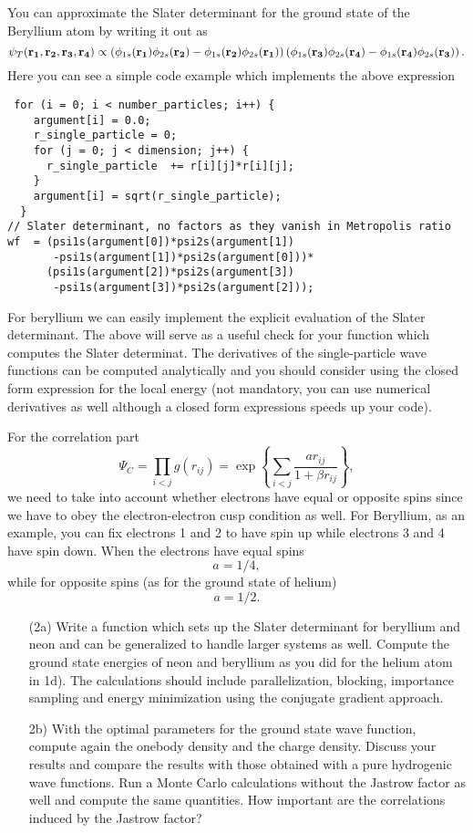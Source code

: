 \documentclass[10pt]{article}
\begin{document}
You can approximate the Slater determinant for the ground state of the Beryllium atom
by writing it out as
\begin{equation}
   \psi_{T}({\bf r_1},{\bf r_2}, {\bf r_3}, {\bf r_4}) \propto 
\left(\phi_{1s}({\bf r_1})\phi_{2s}({\bf r_2})-\phi_{1s}({\bf r_2})\phi_{2s}({\bf r_1})\right)
\left(\phi_{1s}({\bf r_3})\phi_{2s}({\bf r_4})-\phi_{1s}({\bf r_4})\phi_{2s}({\bf r_3})\right).
\end{equation}
Here you can see a simple code example which implements the above expression
\begin{lstlisting}
 for (i = 0; i < number_particles; i++) {
    argument[i] = 0.0;
    r_single_particle = 0;
    for (j = 0; j < dimension; j++) {
      r_single_particle  += r[i][j]*r[i][j];
    }
    argument[i] = sqrt(r_single_particle);
  }
// Slater determinant, no factors as they vanish in Metropolis ratio
wf  = (psi1s(argument[0])*psi2s(argument[1])
       -psi1s(argument[1])*psi2s(argument[0]))*
      (psi1s(argument[2])*psi2s(argument[3])
       -psi1s(argument[3])*psi2s(argument[2]));
\end{lstlisting}
For beryllium we can easily implement the explicit evaluation of the Slater determinant.  The above will serve as a useful check
for your function which computes the Slater determinat. 
The derivatives of the single-particle wave functions can be computed analytically and you should consider
using the closed form expression for the local energy (not mandatory, you can use numerical derivatives as well although a closed form expressions speeds up your code).

For the correlation part 
\[
\Psi_C=\prod_{i< j}g(r_{ij})= \exp{\left\{\sum_{i<j}\frac{ar_{ij}}{1+\beta r_{ij}}\right\}},
\]
we need to take into account whether electrons have equal or opposite spins since we have to obey the
electron-electron cusp condition as well.  For Beryllium, as an example,  you can fix electrons 1 and 2 to have spin up while
electrons 3 and 4 have spin down.
When the electrons have  equal spins 
\[
a= 1/4,
\]
while for opposite spins (as for the ground state of  helium)
\[
a= 1/2.
\] 

\begin{enumerate}
\item[(2a)]   Write a function which sets up the Slater determinant for beryllium and neon and can be generalized to
handle larger systems as well. 
Compute the ground state energies of neon and beryllium as you did for the helium atom
in 1d). 
The calculations should include  parallelization, blocking, importance sampling and energy minimization using the conjugate gradient approach.  


\item[2b)]  With the optimal parameters for the ground state wave function, compute again the onebody density and 
the charge density. Discuss your results and compare the results with those obtained with a pure hydrogenic wave functions. Run a Monte Carlo calculations without the Jastrow factor as well
and compute the same quantities. How important are the correlations induced by the Jastrow factor?


\end{enumerate}
\end{document}

